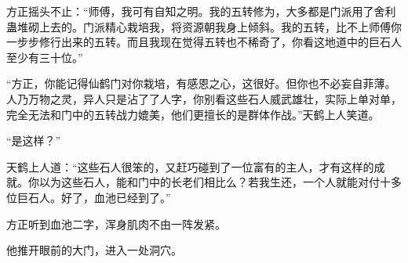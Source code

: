 \begin{this_body}
方正摇头不止：“师傅，我可有自知之明。我的五转修为，大多都是门派用了舍利蛊堆砌上去的。门派精心栽培我，将资源朝我身上倾斜。我的五转，比不上师傅你一步步修行出来的五转。而且我现在觉得五转也不稀奇了，你看这地道中的巨石人至少有三十位。”

“方正，你能记得仙鹤门对你栽培，有感恩之心，这很好。但你也不必妄自菲薄。人乃万物之灵，异人只是沾了了人字，你别看这些石人威武雄壮，实际上单对单，完全无法和门中的五转战力媲美，他们更擅长的是群体作战。”天鹤上人笑道。

“是这样？”

天鹤上人道：“这些石人很笨的，又赶巧碰到了一位富有的主人，才有这样的成就。你以为这些石人，能和门中的长老们相比么？若我生还，一个人就能对付十多位巨石人。好了，血池已经到了。”

方正听到血池二字，浑身肌肉不由一阵发紧。

他推开眼前的大门，进入一处洞穴。

\end{this_body}

